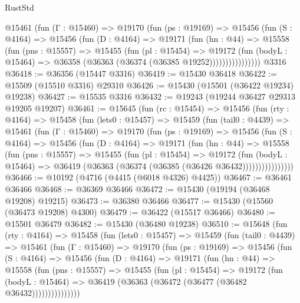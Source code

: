 \begin{lexlean}{RustStd}
\begin{coremodule}
{\begin{coremodule}
{{{{{{{{{{{{{{{{{{{{{{{{{{{{{{{{{{{{{{{{{{{{{{{{{{{{{{{{{{{{            @15461
              (fun (Γ : @15460) =>
              @19170
                (fun (ps : @19169) =>
                @15456
                  (fun (S : @4164) =>
                  @15456
                    (fun (D : @4164) =>
                    @19171
                      (fun (hn : @44) =>
                      @15558
                        (fun (pns : @15557) =>
                        @15455
                          (fun (pl : @15454) =>
                          @19172
                            (fun (bodyL : @15464) =>
                            @36358 (@36363 (@36374 (@36385 @19252))))))))))))))))
    @3316
@36418 := @36356 (@15447 @3316)
@36419 := @15430 @36418
@36422 := @15509 (@15510 @3316) @29310
@36426 := @15430 (@15501 (@36422 @19234) @19238)
@36427 := @15535 @3316
@36432 := @19243 (@19244 @36427 @29313 @19205 @19207)
@36461 := @15645
    (fun (rc : @15454) =>
    @15456
      (fun (rty : @4164) =>
      @15458
        (fun (lets0 : @15457) =>
        @15459
          (fun (tail0 : @4439) =>
          @15461
            (fun (Γ : @15460) =>
            @19170
              (fun (ps : @19169) =>
              @15456
                (fun (S : @4164) =>
                @15456
                  (fun (D : @4164) =>
                  @19171
                    (fun (hn : @44) =>
                    @15558
                      (fun (pns : @15557) =>
                      @15455
                        (fun (pl : @15454) =>
                        @19172
                          (fun (bodyL : @15464) =>
                          @36419 (@36363 (@36374 (@36385 (@36426 @36432))))))))))))))))
@36466 := @10192 (@4716 (@4415 (@6018 @4326) @4425))
@36467 := @36461 @36466
@36468 := @36369 @36466
@36472 := @15430 (@19194 (@36468 @19208) @19215)
@36473 := @36380 @36466
@36477 := @15430 (@15560 (@36473 @19208) @4300)
@36479 := @36422 (@15517 @36466)
@36480 := @15501 @36479
@36482 := @15430 (@36480 @19238)
@36510 := @15648
    (fun (rty : @4164) =>
    @15458
      (fun (lets0 : @15457) =>
      @15459
        (fun (tail0 : @4439) =>
        @15461
          (fun (Γ : @15460) =>
          @19170
            (fun (ps : @19169) =>
            @15456
              (fun (S : @4164) =>
              @15456
                (fun (D : @4164) =>
                @19171
                  (fun (hn : @44) =>
                  @15558
                    (fun (pns : @15557) =>
                    @15455
                      (fun (pl : @15454) =>
                      @19172
                        (fun (bodyL : @15464) =>
                        @36419 (@36363 (@36472 (@36477 (@36482 @36432)))))))))))))))
}}}}}}}}}}}}}}}}}}}}}}}}}}}}}}}}}}}}}}}}}}}}}}}}}}}}}}}}}}}}
\end{coremodule}}
\end{coremodule}
\end{lexlean}
